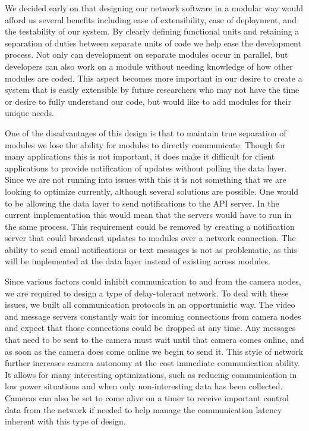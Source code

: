 We decided early on that designing our network software in a modular way would
afford us several benefits including ease of extensibility, ease of deployment,
and the testability of our system. By clearly defining functional units and
retaining a separation of duties between separate units of code we help ease the
development process. Not only can development on separate modules occur in
parallel, but developers can also work on a module without needing knowledge of
how other modules are coded. This aspect becomes more important in our desire to
create a system that is easily extensible by future researchers who may not have
the time or desire to fully understand our code, but would like to add modules
for their unique needs.

One of the disadvantages of this design is that to maintain true separation of
modules we lose the ability for modules to directly communicate.  Though for
many applications this is not important, it does make it difficult for client
applications to provide notification of updates without polling the data layer.
Since we are not running into issues with this it is not something that we are
looking to optimize currently, although several solutions are possible. One
would to be allowing the data layer to send notifications to the API server.  In
the current implementation this would mean that the servers would have to run in
the same process. This requirement could be removed by creating a notification
server that could broadcast updates to modules over a network connection. The
ability to send email notifications or text messages is not as problematic, as
this will be implemented at the data layer instead of existing across modules.



Since various factors could inhibit communication to and from the camera nodes,
we are required to design a type of delay-tolerant network.  To deal with these
issues, we built all communication protocols in an opportunistic way. The video
and message servers constantly wait for incoming connections from camera nodes
and expect that those connections could be dropped at any time. Any messages
that need to be sent to the camera must wait until that camera comes online, and
as soon as the camera does come online we begin to send it. This style of
network further increases camera autonomy at the cost immediate communication
ability. It allows for many interesting optimizations, such as reducing
communication in low power situations and when only non-interesting data has
been collected. Cameras can also be set to come alive on a timer to receive
important control data from the network if needed to help manage the
communication latency inherent with this type of design.

